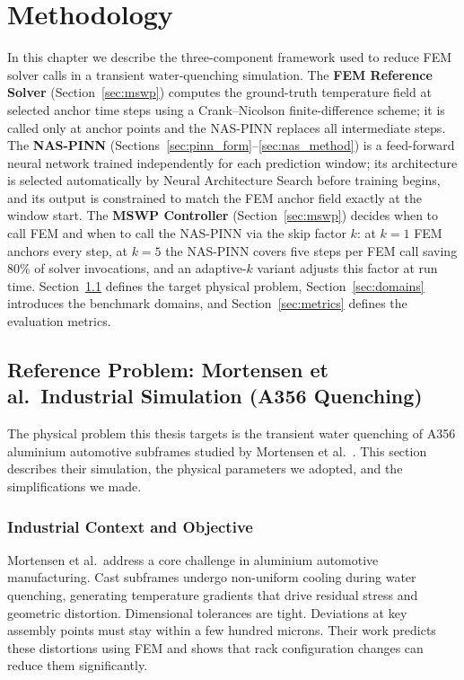 
\chapter{Methodology}
\label{chap:method}

In this chapter we describe the three-component framework used to reduce FEM
solver calls in a transient water-quenching simulation.
The \textbf{FEM Reference Solver} (Section~\ref{sec:mswp}) computes the
ground-truth temperature field at selected anchor time steps using a
Crank--Nicolson finite-difference scheme; it is called only at anchor points
and the NAS-PINN replaces all intermediate steps.
The \textbf{NAS-PINN} (Sections~\ref{sec:pinn_form}--\ref{sec:nas_method}) is
a feed-forward neural network trained independently for each prediction window;
its architecture is selected automatically by Neural Architecture Search before
training begins, and its output is constrained to match the FEM anchor field
exactly at the window start.
The \textbf{MSWP Controller} (Section~\ref{sec:mswp}) decides when to call FEM
and when to call the NAS-PINN via the skip factor $k$: at $k=1$ FEM anchors
every step, at $k=5$ the NAS-PINN covers five steps per FEM call saving 80\%
of solver invocations, and an adaptive-$k$ variant adjusts this factor at run
time.
Section~\ref{sec:mortensen_reference} defines the target physical problem,
Section~\ref{sec:domains} introduces the benchmark domains, and
Section~\ref{sec:metrics} defines the evaluation metrics.

\section{Reference Problem: Mortensen et al.\ Industrial Simulation (A356 Quenching)}
\label{sec:mortensen_reference}

The physical problem this thesis targets is the transient water quenching
of A356 aluminium automotive subframes studied by Mortensen et al.\
\cite{mortensen2026}.
This section describes their simulation, the physical parameters we adopted,
and the simplifications we made.

\subsection{Industrial Context and Objective}

Mortensen et al.\ address a core challenge in aluminium automotive
manufacturing.
Cast subframes undergo non-uniform cooling during water quenching, generating
temperature gradients that drive residual stress and geometric distortion.
Dimensional tolerances are tight.
Deviations at key assembly points must stay within a few hundred microns.
Their work predicts these distortions using FEM and shows that rack
configuration changes can reduce them significantly.

